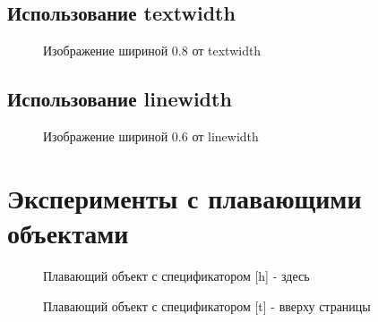 \documentclass[12pt]{article}
\begin{document}
\subsection{Использование textwidth}
\label{subsec:textwidth}

\begin{figure}[htbp]
    \centering
    \caption{Изображение шириной 0.8 от textwidth}
    \label{fig:textwidth}
\end{figure}

\lipsum[5]

\subsection{Использование linewidth}
\label{subsec:linewidth}

\begin{figure}[htbp]
    \centering
    \caption{Изображение шириной 0.6 от linewidth}
    \label{fig:linewidth}
\end{figure}

\lipsum[6]

\section{Эксперименты с плавающими объектами}
\label{sec:floats}

\lipsum[7]

\begin{figure}[h]
    \centering
    \caption{Плавающий объект с спецификатором [h] - здесь}
    \label{fig:here}
\end{figure}

\lipsum[8]

\begin{figure}[t]
    \centering
    \caption{Плавающий объект с спецификатором [t] - вверху страницы}
    \label{fig:top}
\end{figure}
\end{document}
